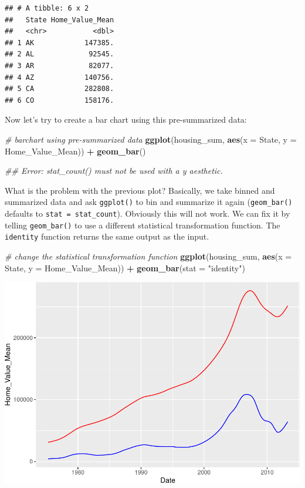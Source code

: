 \documentclass[
]{book}
\newenvironment{Shaded}{\begin{snugshade}}{\end{snugshade}}
\newcommand{\CommentTok}[1]{\textcolor[rgb]{0.56,0.35,0.01}{\textit{#1}}}
\newcommand{\DataTypeTok}[1]{\textcolor[rgb]{0.13,0.29,0.53}{#1}}
\newcommand{\KeywordTok}[1]{\textcolor[rgb]{0.13,0.29,0.53}{\textbf{#1}}}
\newcommand{\NormalTok}[1]{#1}
\newcommand{\OperatorTok}[1]{\textcolor[rgb]{0.81,0.36,0.00}{\textbf{#1}}}
\newcommand{\StringTok}[1]{\textcolor[rgb]{0.31,0.60,0.02}{#1}}
\begin{document}
\begin{verbatim}
## # A tibble: 6 x 2
##   State Home_Value_Mean
##   <chr>           <dbl>
## 1 AK            147385.
## 2 AL             92545.
## 3 AR             82077.
## 4 AZ            140756.
## 5 CA            282808.
## 6 CO            158176.
\end{verbatim}

Now let's try to create a bar chart using this pre-summarized data:

\begin{Shaded}
\begin{Highlighting}[]
\CommentTok{\# barchart using pre{-}summarized data}
\KeywordTok{ggplot}\NormalTok{(housing\_sum, }\KeywordTok{aes}\NormalTok{(}\DataTypeTok{x =}\NormalTok{ State, }\DataTypeTok{y =}\NormalTok{ Home\_Value\_Mean)) }\OperatorTok{+}\StringTok{ }
\StringTok{  }\KeywordTok{geom\_bar}\NormalTok{()}

\CommentTok{\#\# Error: stat\_count() must not be used with a y aesthetic.  }
\end{Highlighting}
\end{Shaded}

What is the problem with the previous plot? Basically, we take binned and summarized data and ask \texttt{ggplot()} to bin and summarize it again (\texttt{geom\_bar()} defaults to \texttt{stat\ =\ stat\_count}). Obviously this will not work. We can fix it by telling \texttt{geom\_bar()} to use a different statistical transformation function. The \texttt{identity} function returns the same output as the input.

\begin{Shaded}
\begin{Highlighting}[]
\CommentTok{\# change the statistical transformation function}
\KeywordTok{ggplot}\NormalTok{(housing\_sum, }\KeywordTok{aes}\NormalTok{(}\DataTypeTok{x =}\NormalTok{ State, }\DataTypeTok{y =}\NormalTok{ Home\_Value\_Mean)) }\OperatorTok{+}\StringTok{ }
\StringTok{  }\KeywordTok{geom\_bar}\NormalTok{(}\DataTypeTok{stat =} \StringTok{"identity"}\NormalTok{)}
\end{Highlighting}
\end{Shaded}

\includegraphics{R/Rgraphics/figures/unnamed-chunk-185-1.pdf}
\end{document}
